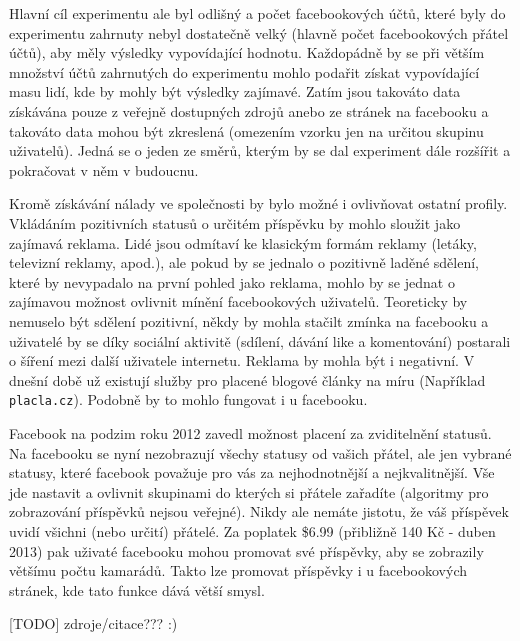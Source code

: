\documentclass[thesis=M,czech]{FITthesis}[2013/05/10]
\begin{document}
Hlavní cíl experimentu ale byl odlišný a počet facebookových účtů, které byly do experimentu zahrnuty nebyl dostatečně velký (hlavně počet facebookových přátel účtů), aby měly výsledky vypovídající hodnotu. Každopádně by se při větším množství účtů zahrnutých do experimentu mohlo podařit získat vypovídající masu lidí, kde by mohly být výsledky zajímavé. Zatím jsou takováto data získávána pouze z veřejně dostupných zdrojů anebo ze stránek na facebooku a takováto data mohou být zkreslená (omezením vzorku jen na určitou skupinu uživatelů). Jedná se o jeden ze směrů, kterým by se dal experiment dále rozšířit a pokračovat v něm v budoucnu.

Kromě získávání nálady ve společnosti by bylo možné i ovlivňovat ostatní profily. Vkládáním pozitivních statusů o určitém příspěvku by mohlo sloužit jako zajímavá reklama. Lidé jsou odmítaví ke klasickým formám reklamy (letáky, televizní reklamy, apod.), ale pokud by se jednalo o pozitivně laděné sdělení, které by nevypadalo na první pohled jako reklama, mohlo by se jednat o zajímavou možnost ovlivnit mínění facebookových uživatelů. Teoreticky by nemuselo být sdělení pozitivní, někdy by mohla stačilt zmínka na facebooku a uživatelé by se díky sociální aktivitě (sdílení, dávání like a komentování) postarali o šíření mezi další uživatele internetu. Reklama by mohla být i negativní. V dnešní době už existují služby pro placené blogové články na míru (Například \verb|placla.cz|). Podobně by to mohlo fungovat i u facebooku.

Facebook na podzim roku 2012 zavedl možnost placení za zviditelnění statusů. Na facebooku se nyní nezobrazují všechy statusy od vašich přátel, ale jen vybrané statusy, které facebook považuje pro vás za nejhodnotnější a nejkvalitnější. Vše jde nastavit a ovlivnit skupinami do kterých si přátele zařadíte (algoritmy pro zobrazování příspěvků nejsou veřejné). Nikdy ale nemáte jistotu, že váš příspěvek uvidí všichni (nebo určití) přátelé. Za poplatek \$6.99 (přibližně 140 Kč - duben 2013) pak uživaté facebooku mohou promovat své příspěvky, aby se zobrazily většímu počtu kamarádů. Takto lze promovat příspěvky i u facebookových stránek, kde tato funkce dává větší smysl.


[TODO] zdroje/citace??? :)



\appendix
\end{document}
